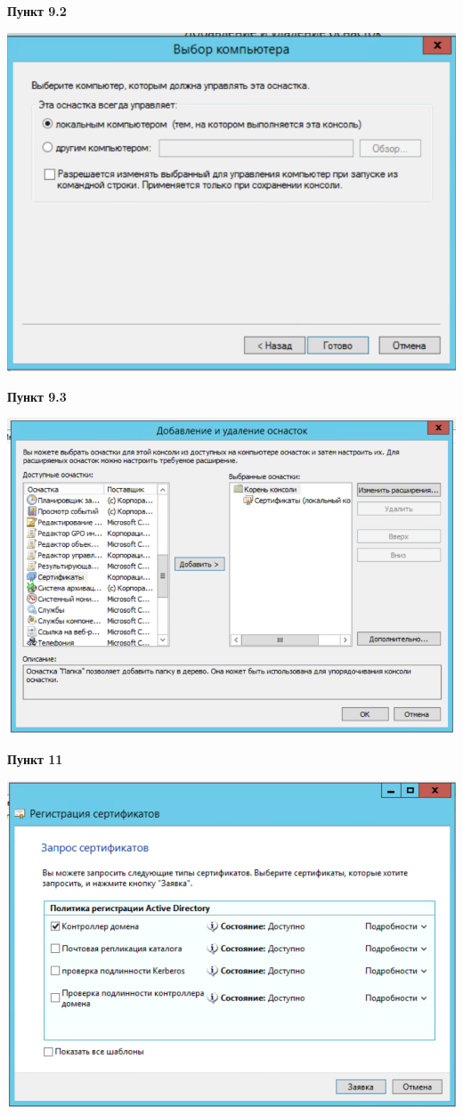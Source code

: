 \documentclass[a4paper,14pt]{extarticle}
\begin{document}
    \textbf{Пункт 9.2}
    \begin{center}
        \includegraphics[scale=0.75]{9.2}
    \end{center}
    \textbf{Пункт 9.3}
    \begin{center}
        \includegraphics[scale=0.6]{9.3}
    \end{center}
    \newpage
    \textbf{Пункт 11}
    \begin{center}
        \includegraphics[scale=0.6]{11}
    \end{center}
\end{document}

